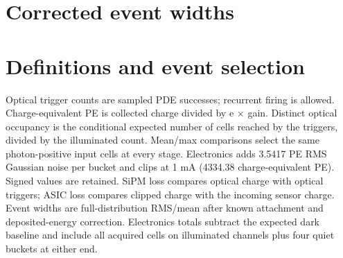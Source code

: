 \documentclass[11pt,a4paper]{article}
\begin{document}
\section*{Corrected event widths}\begin{center}\end{center}
\begin{center}\end{center}
\section*{Definitions and event selection}
Optical trigger counts are sampled PDE successes; recurrent firing is allowed. Charge-equivalent PE is collected charge divided by e $\times$ gain. Distinct optical occupancy is the conditional expected number of cells reached by the triggers, divided by the illuminated count. Mean/max comparisons select the same photon-positive input cells at every stage. Electronics adds 3.5417 PE RMS Gaussian noise per bucket and clips at 1 mA (4334.38 charge-equivalent PE). Signed values are retained. SiPM loss compares optical charge with optical triggers; ASIC loss compares clipped charge with the incoming sensor charge. Event widths are full-distribution RMS/mean after known attachment and deposited-energy correction. Electronics totals subtract the expected dark baseline and include all acquired cells on illuminated channels plus four quiet buckets at either end.
\end{document}
